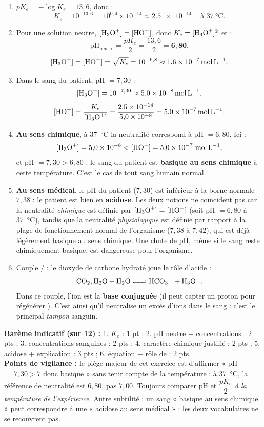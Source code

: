 \documentclass[11pt]{article}
\begin{document}
\begin{corrige}
\begin{enumerate}
\item $pK_e = -\log K_e = 13{,}6$, donc :
\[ K_e = 10^{-13{,}6} = 10^{0{,}4}\times10^{-14} \approx \SI{2,5e-14}{} \quad \text{à } \SI{37}{\celsius}. \]
\item Pour une solution neutre, $[\ce{H3O+}] = [\ce{HO-}]$, donc $K_e = [\ce{H3O+}]^2$ et :
\[ \mathrm{pH}_{\text{neutre}} = \frac{pK_e}{2} = \frac{13{,}6}{2} = \mathbf{6{,}80}. \]
\[ [\ce{H3O+}] = [\ce{HO-}] = \sqrt{K_e} = 10^{-6{,}8} \approx \SI{1,6e-7}{mol.L^{-1}}. \]
\item Dans le sang du patient, pH $= 7{,}30$ :
\[ [\ce{H3O+}] = 10^{-7{,}30} \approx \SI{5,0e-8}{mol.L^{-1}}. \]
\[ [\ce{HO-}] = \frac{K_e}{[\ce{H3O+}]} = \frac{2{,}5\times10^{-14}}{5{,}0\times10^{-8}} = \SI{5,0e-7}{mol.L^{-1}}. \]
\item \textbf{Au sens chimique}, à \SI{37}{\celsius} la neutralité correspond à pH $= 6{,}80$. Ici :
\[ [\ce{H3O+}] = 5{,}0\times10^{-8} < [\ce{HO-}] = 5{,}0\times10^{-7}\ \si{mol.L^{-1}}, \]
et pH $= 7{,}30 > 6{,}80$ : le sang du patient est \textbf{basique au sens chimique} à cette température. C'est le cas de tout sang humain normal.
\item \textbf{Au sens médical}, le pH du patient ($7{,}30$) est inférieur à la borne normale $7{,}38$ : le patient est bien en \textbf{acidose}. Les deux notions ne coïncident pas car la neutralité \emph{chimique} est définie par $[\ce{H3O+}] = [\ce{HO-}]$ (soit pH $= 6{,}80$ à \SI{37}{\celsius}), tandis que la neutralité \emph{physiologique} est définie par rapport à la plage de fonctionnement normal de l'organisme ($7{,}38$ à $7{,}42$), qui est déjà légèrement basique au sens chimique. Une chute de pH, même si le sang reste chimiquement basique, est dangereuse pour l'organisme.
\item Couple / : le dioxyde de carbone hydraté joue le rôle d'acide :
\[ \ce{CO2,H2O + H2O <=> HCO3- + H3O+}. \]
Dans ce couple, l'ion  est la \textbf{base conjuguée} (il peut capter un proton pour régénérer ). C'est ainsi qu'il neutralise un excès d'ions  dans le sang : c'est le principal \emph{tampon} sanguin.
\end{enumerate}
\textbf{Barème indicatif (sur 12) :} 1. $K_e$ : 1 pt ; 2. pH neutre + concentrations : 2 pts ; 3. concentrations sanguines : 2 pts ; 4. caractère chimique justifié : 2 pts ; 5. acidose + explication : 3 pts ; 6. équation + rôle de  : 2 pts.\\
\textbf{Points de vigilance :} le piège majeur de cet exercice est d'affirmer « pH $= 7{,}30 > 7$ donc basique » sans tenir compte de la température : à \SI{37}{\celsius}, la référence de neutralité est $6{,}80$, pas $7{,}00$. Toujours comparer pH et $\dfrac{pK_e}{2}$ \emph{à la température de l'expérience}. Autre subtilité : un sang « basique au sens chimique » peut correspondre à une « acidose au sens médical » : les deux vocabulaires ne se recouvrent pas.
\end{corrige}
\end{document}
